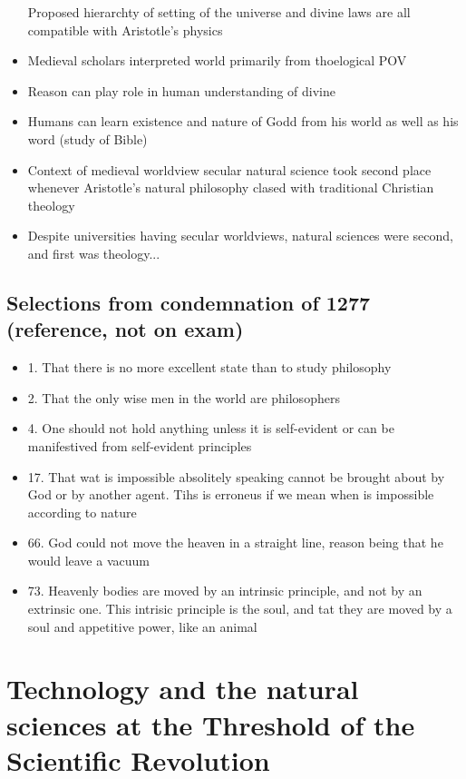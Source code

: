 \documentclass{article}
\begin{document}
\begin{itemize}
    Proposed hierarchty of setting of the universe and divine
    laws are all compatible with Aristotle's physics
  \item Medieval scholars interpreted world primarily from thoelogical POV
  \item Reason can play role in human understanding of divine
  \item Humans can learn existence and nature of Godd from his world as well as his word (study of Bible)
  \item Context of medieval worldview secular natural science took second place
    whenever Aristotle's natural philosophy clased with traditional Christian theology
  \item Despite universities having secular worldviews, natural sciences were second, and first
    was theology...
\end{itemize}

\subsection{Selections from condemnation of 1277 (reference, not on exam)}
\begin{itemize}
  \item 1. That there is no more excellent state than to study philosophy
  \item 2. That the only wise men in the world are philosophers
  \item 4. One should not hold anything unless it is self-evident or can
    be manifestived from self-evident principles
  \item 17. That wat is impossible absolitely speaking cannot be brought
    about by God or by another agent. Tihs is erroneus if we mean when is impossible according to nature
  \item 66. God could not move the heaven in a straight line, reason being that he would leave a vacuum
  \item 73. Heavenly bodies are moved by an intrinsic principle, and not by an extrinsic one.
    This intrisic principle is the soul, and tat they are moved by a soul and appetitive power, like an animal
\end{itemize}


\section{Technology and the natural sciences at the Threshold of the Scientific Revolution}
\end{document}
